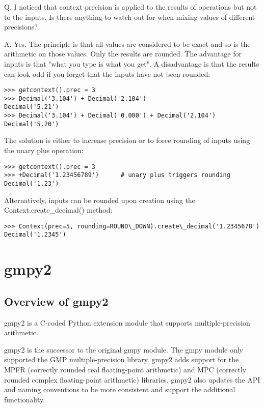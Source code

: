 Q. I noticed that context precision is applied to the results of operations but not to the inputs. Is there anything to watch out for when mixing values of different precisions?

A. Yes. The principle is that all values are considered to be exact and so is the arithmetic on those values. Only the results are rounded. The advantage for inputs is that "what you type is what you get". A disadvantage is that the results can look odd if you forget that the inputs have not been rounded:

\begin{lstlisting}
>>> getcontext().prec = 3
>>> Decimal('3.104') + Decimal('2.104')
Decimal('5.21')
>>> Decimal('3.104') + Decimal('0.000') + Decimal('2.104')
Decimal('5.20')
\end{lstlisting}

The solution is either to increase precision or to force rounding of inputs using the unary plus operation:

\begin{lstlisting}
>>> getcontext().prec = 3
>>> +Decimal('1.23456789')      # unary plus triggers rounding
Decimal('1.23')
\end{lstlisting}

Alternatively, inputs can be rounded upon creation using the Context.create\_decimal() method:

\begin{lstlisting}
>>> Context(prec=5, rounding=ROUND\_DOWN).create\_decimal('1.2345678')
Decimal('1.2345')
\end{lstlisting}





\chapter{gmpy2}

\section{Overview of gmpy2}
\label{gmpy2}

gmpy2 is a C-coded Python extension module that supports multiple-precision arithmetic.

gmpy2 is the successor to the original gmpy module. The gmpy module only supported the
GMP multiple-precision library. gmpy2 adds support for the MPFR (correctly rounded real
floating-point arithmetic) and MPC (correctly rounded complex floating-point arithmetic)
libraries. gmpy2 also updates the API and naming conventions to be more consistent and
support the additional functionality.

